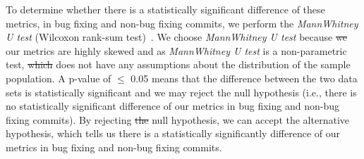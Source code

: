 \documentclass[conference]{IEEEtran}
\providecommand{\DIFadd}[1]{{\protect\color{blue}\uwave{#1}}} %
\providecommand{\DIFdel}[1]{{\protect\color{red}\sout{#1}}}                      %
\providecommand{\DIFaddbegin}{} %
\providecommand{\DIFaddend}{} %
\providecommand{\DIFdelbegin}{} %
\providecommand{\DIFdelend}{} %
\begin{document}
To determine whether there is a statistically significant difference of these metrics, in bug fixing and non-bug fixing commits, we perform the \textsl{MannWhitney U test} (Wilcoxon rank-sum test)~\cite{gehan1965generalized}. We choose {\em MannWhitney U test} because \DIFdelbegin \DIFdel{we }\DIFdelend our metrics are highly skewed and as {\em MannWhitney U test} is a non-parametric test, \DIFdelbegin \DIFdel{which }\DIFdelend \DIFaddbegin \DIFadd{it }\DIFaddend does not have any assumptions about the distribution of the sample population. A p-value of \ensuremath{\le} 0.05 means that the difference between the two data sets is statistically significant and we may reject the null hypothesis (i.e., there is no statistically significant difference of our metrics in bug fixing and non-bug fixing commits). By rejecting  \DIFdelbegin \DIFdel{the }\DIFdelend \DIFaddbegin \DIFadd{he }\DIFaddend null hypothesis, we can accept the alternative hypothesis, which tells us there is a statistically significantly difference of our metrics in bug fixing and non-bug fixing commits.

\end{document}

